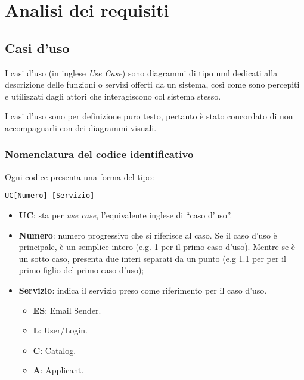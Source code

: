 
\chapter{Analisi dei requisiti}
\label{cap:analisi-requisiti}


\section{Casi d'uso}

I casi d'uso (in inglese \emph{Use Case}) sono diagrammi di tipo \gls{uml} dedicati alla descrizione delle funzioni o servizi offerti da un sistema, così come sono percepiti e utilizzati dagli attori che interagiscono col sistema stesso.

I casi d'uso sono per definizione puro testo, pertanto è stato concordato di non accompagnarli con dei diagrammi visuali.

\subsection{Nomenclatura del codice identificativo}

Ogni codice presenta una forma del tipo:

\begin{center}
	\texttt{UC[Numero]-[Servizio]}
\end{center}

\begin{itemize}
	\item \textbf{UC}: sta per \textit{use case}, l'equivalente inglese di ``caso d'uso''.
	\item \textbf{Numero}: numero progressivo che si riferisce al caso. Se il caso d'uso è principale, è un semplice intero (e.g. 1 per il primo caso d'uso). Mentre se è un sotto caso, presenta due interi separati da un punto (e.g 1.1 per per il primo figlio del primo caso d'uso);
	\item \textbf{Servizio}: indica il servizio preso come riferimento per il caso d'uso.
	\begin{itemize}
		\item \textbf{ES}: Email Sender.
		\item \textbf{L}: User/Login.
		\item \textbf{C}: Catalog.
		\item \textbf{A}: Applicant.
	\end{itemize}
\end{itemize}

